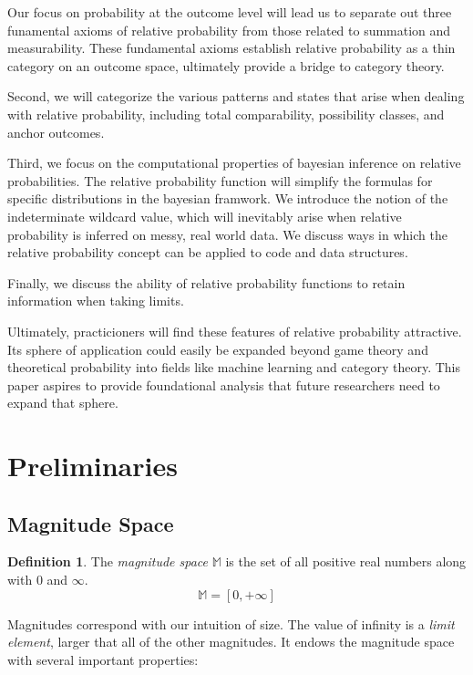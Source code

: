 \documentclass[twoside]{article}
\theoremstyle{plain}%
\theoremstyle{definition}
\newtheorem{definition}{Definition}[section]
\theoremstyle{remark}
\begin{document}
Our focus on probability at the outcome level will lead us to separate out three funamental axioms of relative probability from those related to summation and measurability. These fundamental axioms establish relative probability as a thin category on an outcome space, ultimately provide a bridge to category theory.

Second, we will categorize the various patterns and states that arise when dealing with relative probability, including total comparability, possibility classes, and anchor outcomes. 

Third, we focus on the computational properties of bayesian inference on relative probabilities. The relative probability function will simplify the formulas for specific distributions in the bayesian framwork. We introduce the notion of the indeterminate wildcard value, which will inevitably arise when relative probability is inferred on messy, real world data. We discuss ways in which the relative probability concept can be applied to code and data structures.

Finally, we discuss the ability of relative probability functions to retain information when taking limits.

Ultimately, practicioners will find these features of relative probability attractive. Its sphere of application could easily be expanded beyond game theory and theoretical probability into fields like machine learning and category theory. This paper aspires to provide foundational analysis that future researchers need to expand that sphere.

\section{Preliminaries}
\subsection{Magnitude Space}

\begin{definition}
The \textit{magnitude space} \(\mathbb{M}\) is the set of all positive real numbers along with \(0\) and \(\infty\).
\[\mathbb{M} = [0, +\infty]\]
\end{definition}

Magnitudes correspond with our intuition of size. The value of infinity is a \textit{limit element}, larger that all of the other magnitudes. It endows the magnitude space with several important properties:
\end{document}
